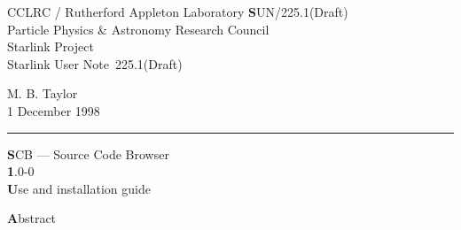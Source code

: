 \documentclass[twoside,11pt]{article}
\newcommand{\stardoccategory}  {Starlink User Note}
\newcommand{\stardocinitials}  {SUN}
\newcommand{\stardocnumber}    {225.1(Draft)}
\newcommand{\stardocauthors}   {M. B. Taylor}
\newcommand{\stardocdate}      {1 December 1998}
\newcommand{\stardoctitle}     {SCB --- Source Code Browser}
\newcommand{\stardocversion}   {1.0-0}
\newcommand{\stardocmanual}    {Use and installation guide}
\newcommand{\stardocname}{\stardocinitials /\stardocnumber}
\newenvironment{latexonly}{}{}
\renewcommand{\_}{\texttt{\symbol{95}}}
\begin{document}
\thispagestyle{empty}

\begin{latexonly}
   CCLRC / {\textsc Rutherford Appleton Laboratory} \hfill {\textbf \stardocname}\\
   {\large Particle Physics \& Astronomy Research Council}\\
   {\large Starlink Project\\}
   {\large \stardoccategory\ \stardocnumber}
   \begin{flushright}
   \stardocauthors\\
   \stardocdate
   \end{flushright}
   \vspace{-4mm}
   \rule{\textwidth}{0.5mm}
   \vspace{5mm}
   \begin{center}
   {\Huge\textbf  \stardoctitle \\ [2.5ex]}
   {\LARGE\textbf \stardocversion \\ [4ex]}
   {\Huge\textbf  \stardocmanual}
   \end{center}
   \vspace{5mm}


   \vspace{10mm}
   \begin{center}
      {\Large\textbf Abstract}
   \end{center}
\end{latexonly}
\end{document}
